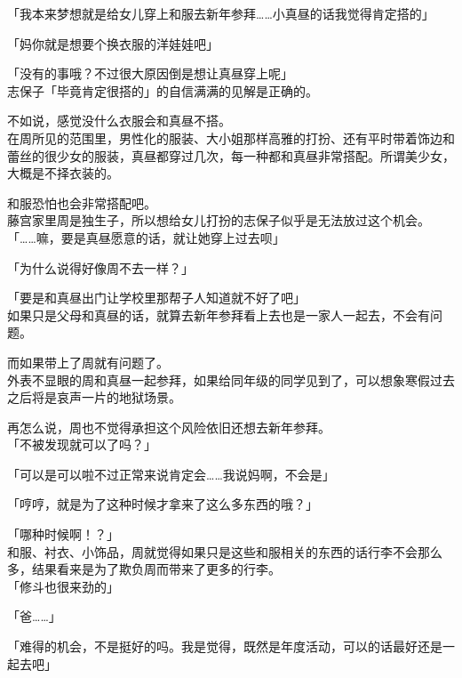 「我本来梦想就是给女儿穿上和服去新年参拜……小真昼的话我觉得肯定搭的」

「妈你就是想要个换衣服的洋娃娃吧」

「没有的事哦？不过很大原因倒是想让真昼穿上呢」\\

志保子「毕竟肯定很搭的」的自信满满的见解是正确的。

不如说，感觉没什么衣服会和真昼不搭。\\

在周所见的范围里，男性化的服装、大小姐那样高雅的打扮、还有平时带着饰边和蕾丝的很少女的服装，真昼都穿过几次，每一种都和真昼非常搭配。所谓美少女，大概是不择衣装的。

和服恐怕也会非常搭配吧。\\

藤宫家里周是独生子，所以想给女儿打扮的志保子似乎是无法放过这个机会。\\

「……嘛，要是真昼愿意的话，就让她穿上过去呗」

「为什么说得好像周不去一样？」

「要是和真昼出门让学校里那帮子人知道就不好了吧」\\

如果只是父母和真昼的话，就算去新年参拜看上去也是一家人一起去，不会有问题。

而如果带上了周就有问题了。\\

外表不显眼的周和真昼一起参拜，如果给同年级的同学见到了，可以想象寒假过去之后将是哀声一片的地狱场景。

再怎么说，周也不觉得承担这个风险依旧还想去新年参拜。\\

「不被发现就可以了吗？」

「可以是可以啦不过正常来说肯定会……我说妈啊，不会是」

「哼哼，就是为了这种时候才拿来了这么多东西的哦？」

「哪种时候啊！？」\\

和服、衬衣、小饰品，周就觉得如果只是这些和服相关的东西的话行李不会那么多，结果看来是为了欺负周而带来了更多的行李。\\

「修斗也很来劲的」

「爸……」

「难得的机会，不是挺好的吗。我是觉得，既然是年度活动，可以的话最好还是一起去吧」\\

